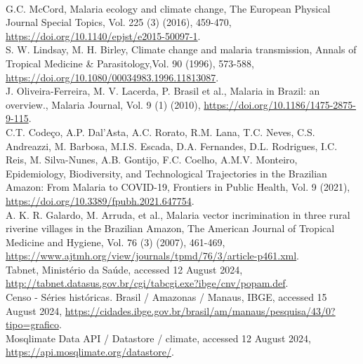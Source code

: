 \documentclass[a4paper,fleqn]{cas-dc}
\begin{document}
\begin{thebibliography}{00}
\\
 G.C. McCord, Malaria ecology and climate change, The European Physical Journal Special Topics, Vol. 225 (3) (2016), 459-470, \href{https://doi.org/10.1140/epjst/e2015-50097-1}{https://doi.org/10.1140/epjst/e2015-50097-1}.
\\
 S. W. Lindsay, M. H. Birley, Climate change and malaria transmission, Annals of Tropical Medicine \& Parasitology,Vol. 90 (1996), 573-588, \href{https://doi.org/10.1080/00034983.1996.11813087}{https://doi.org/10.1080/00034983.1996.11813087}.
\\
 J. Oliveira-Ferreira, M. V. Lacerda, P. Brasil et al., Malaria in Brazil: an overview., Malaria Journal, Vol. 9 (1) (2010), \href{https://doi.org/10.1186/1475-2875-9-115}{https://doi.org/10.1186/1475-2875-9-115}.
\\
 C.T. Codeço, A.P. Dal'Asta, A.C. Rorato, R.M. Lana, T.C. Neves, C.S. Andreazzi, M. Barbosa, M.I.S. Escada, D.A. Fernandes, D.L. Rodrigues, I.C. Reis, M. Silva-Nunes, A.B. Gontijo, F.C. Coelho, A.M.V. Monteiro, Epidemiology, Biodiversity, and Technological Trajectories in the Brazilian Amazon: From Malaria to COVID-19, Frontiers in Public Health, Vol. 9 (2021), \href{https://doi.org/10.3389/fpubh.2021.647754}{https://doi.org/10.3389/fpubh.2021.647754}.
\\
 A. K. R. Galardo, M. Arruda, et al., Malaria vector incrimination in three rural riverine villages in the Brazilian Amazon, The American Journal of Tropical Medicine and Hygiene, Vol. 76 (3) (2007), 461-469, \href{https://www.ajtmh.org/view/journals/tpmd/76/3/article-p461.xml}{https://www.ajtmh.org/view/journals/tpmd/76/3/article-p461.xml}.
\\
 Tabnet, Ministério da Saúde, accessed 12 August 2024, \href{http://tabnet.datasus.gov.br/cgi/tabcgi.exe?ibge/cnv/popam.def}{http://tabnet.datasus.gov.br/cgi/tabcgi.exe?ibge/cnv/popam.def}.
\\
 Censo - Séries históricas. Brasil / Amazonas / Manaus, IBGE, accessed 15 August 2024, \href{https://cidades.ibge.gov.br/brasil/am/manaus/pesquisa/43/0?tipo=grafico}{https://cidades.ibge.gov.br/brasil/am/manaus/pesquisa/43/0?tipo=grafico}.
\\
 Mosqlimate Data API / Datastore / climate, accessed 12 August 2024, \href{https://api.mosqlimate.org/datastore/}{https://api.mosqlimate.org/datastore/}.

\end{thebibliography}
\end{document}
